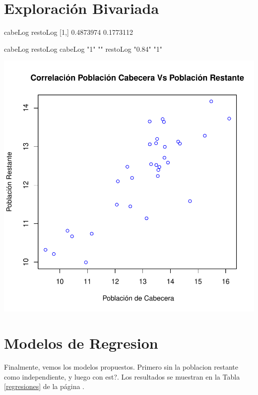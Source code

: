 \documentclass{article}
\begin{document}
\clearpage
\section{Exploración Bivariada}\label{bivariada}



\begin{Schunk}
\begin{Soutput}
       cabeLog  restoLog
[1,] 0.4873974 0.1773112
\end{Soutput}
\begin{Soutput}
         cabeLog restoLog
cabeLog  "1"     ""      
restoLog "0.84"  "1"     
\end{Soutput}
\end{Schunk}
\includegraphics{Preliminar-correl}

\clearpage

\section{Modelos de Regresion}

Finalmente, vemos los modelos propuestos. Primero sin la poblacion restante como independiente, y luego con est?. Los resultados se muestran en la Tabla \ref{regresiones} de la página \pageref{regresiones}.
\end{document}

